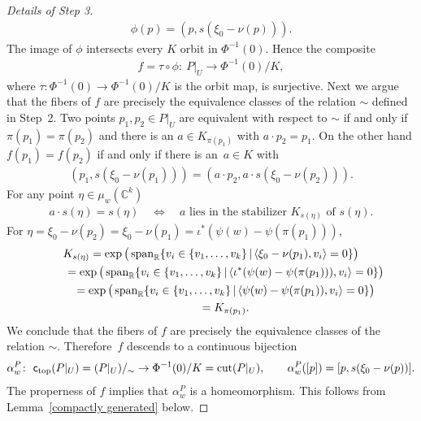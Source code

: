 \documentclass[pdftex]{sigma}
\numberwithin{equation}{section}
\begin{document}
\begin{proof}[Details of Step 3]
\begin{gather*}
     \phi(p) = (p, s (\xi_0 - \nu(p))).
\end{gather*}
The image of $\phi$
intersects every $K$ orbit in $\Phi^{-1} (0)$.  Hence the composite
\begin{gather*}
f = \tau\circ \phi\colon \ P|_U\to \Phi^{-1} (0)/K,
\end{gather*}
where $\tau\colon  \Phi^{-1} (0)\to \Phi^{-1} (0)/K$ is the orbit map, is
surjective.  Next we argue that the f\/ibers of $f$ are precisely
the equivalence classes of the relation $\sim$ def\/ined in Step~2.
Two points $p_1, p_2\in P|_U$ are equivalent
with respect to $\sim$ if and only if $\pi (p_1) = \pi(p_2)$ and there
is an $a\in K_{\pi (p_1)}$ with $a\cdot p_2 = p_1$.  On the other hand
$f(p_1) = f(p_2)$ if and only if there is an~$a\in K$ with
\begin{gather*}
(p_1,  s (\xi_0 - \nu(p_1))) = (a\cdot p_2, a\cdot s(\xi_0 - \nu(p_2))).
\end{gather*}
For any point $\eta\in \mu_w({\mathbb C}^k)$
\begin{gather*}
a\cdot s(\eta) = s(\eta) \quad \Leftrightarrow \quad a
  \textrm{ lies in the stabilizer }K_{s(\eta)}\textrm{ of } s(\eta).
\end{gather*}
For $\eta = \xi_0 -\nu(p_2) =\xi_0 -\nu(p_1)
 =  \iota^*(\psi(w)-\psi (\pi(p_1)))$,
\begin{gather*}
K_{s(\eta)}  =  \exp \big(\operatorname{span}_{\mathbb R} \{v_i \in \{v_1,\ldots, v_k\} \,|\, \langle
  \xi_0 - \nu(p_1), v_i\rangle = 0\}\big)\\
 \hphantom{K_{s(\eta)}}{}
 =  \exp \big(\operatorname{span}_{\mathbb R} \{v_i \in \{v_1,\ldots, v_k\} \,|\, \langle
  \iota^*(\psi(w)- \psi (\pi(p_1))) , v_i\rangle = 0\}\big)\\
\hphantom{K_{s(\eta)}}{} =  \exp \big(\operatorname{span}_{\mathbb R} \{v_i \in \{v_1,\ldots, v_k\} \,|\, \langle
  \psi(w)- \psi (\pi(p_1)), v_i\rangle = 0\}\big) \\
\hphantom{K_{s(\eta)}}{} =  K_{\pi(p_1)}.
\end{gather*}
We conclude that the f\/ibers of $f$ are precisely
the equivalence classes of the relation $\sim$.
Therefo\-re~$f$ descends to a continuous bijection
\begin{gather*}
\alpha^P_w\colon  \  {\textsf{c}_{\rm top}} (P|_U)=(P|_U)/_{\sim}   \to
   \Phi^{-1} (0)/K= \operatorname{cut}(P|_U), \qquad \alpha^P_w([p])=[p,s(\xi_0 - \nu(p))] .
\end{gather*}
The properness of $f$ implies that $\alpha^P_w$ is a homeomorphism.
This follows from Lemma~\ref{compactly generated} below.


\end{proof}
\end{document}
